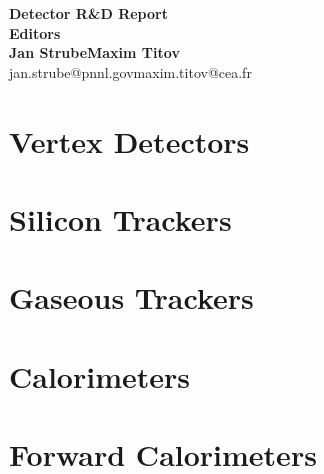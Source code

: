 \documentclass[10pt,final]{report}
\begin{document}
\begin{titlepage}
    \begin{center}
        \textbf{\huge Detector R\&D Report}\\
        \vspace{1.5cm}
        \textbf{\Large Editors}\\
        \textbf{\Large Jan Strube\qquad Maxim Titov} \\
        jan.strube@pnnl.gov\qquad maxim.titov@cea.fr \\
    \end{center}
\end{titlepage}
\tableofcontents
\chapter{Vertex Detectors}








\newpage


\newpage
\chapter{Silicon Trackers}




\chapter{Gaseous Trackers}



\chapter{Calorimeters}












\chapter{Forward Calorimeters}


\end{document}
